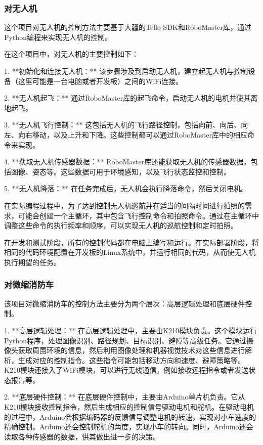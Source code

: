 \documentclass[12pt, a4paper, oneside]{article}
\begin{document}
\subsubsection{对无人机}

这个项目对无人机的控制方法主要基于大疆的Tello SDK和RoboMaster库，通过Python编程来实现无人机的控制。

在这个项目中，对无人机的主要控制如下：

1. **初始化和连接无人机：** 该步骤涉及到启动无人机，建立起无人机与控制设备（这里可能是一台电脑或者开发板）之间的WiFi连接。

2. **无人机起飞：** 通过RoboMaster库的起飞命令，启动无人机的电机并使其离地起飞。

3. **无人机飞行控制：** 这包括无人机的飞行路径控制，包括向前、向后、向左、向右移动，以及上升和下降。这些控制都可以通过RoboMaster库中的相应命令来实现。

4. **获取无人机传感器数据：** RoboMaster库还能获取无人机的传感器数据，包括图像、姿态等。这些数据可用于环境感知，以及飞行状态监控和控制。

5. **无人机降落：** 在任务完成后，无人机会执行降落命令，然后关闭电机。

在实际编程过程中，为了达到控制无人机巡航并在适当的间隔时间进行拍照的需求，可能会创建一个主循环，其中包含飞行控制命令和拍照命令。通过在主循环中调整这些命令的执行频率和顺序，可以实现无人机的巡航控制和定时拍照。

在开发和测试阶段，所有的控制代码都在电脑上编写和运行。在实际部署阶段，将相同的代码环境配置在开发板的Linux系统中，并运行相同的代码，从而使无人机执行期望的任务。

\subsubsection{对微缩消防车}

该项目对微缩消防车的控制方法主要分为两个层次：高层逻辑处理和底层硬件控制。

1. **高层逻辑处理：** 在高层逻辑处理中，主要由K210模块负责。这个模块运行Python程序，处理图像识别、路径规划、目标识别、避障等高级任务。它通过摄像头获取周围环境的信息，然后利用图像处理和机器视觉技术对这些信息进行解析，生成对应的控制指令。这些指令可能包括移动方向和速度、避障策略等。K210模块还接入了WiFi模块，可以进行无线通信，例如接收远程指令或者发送状态报告等。

2. **底层硬件控制：** 在底层硬件控制中，主要由Arduino单片机负责。它从K210模块接收控制指令，然后生成相应的控制信号驱动电机和舵机。在驱动电机的过程中，Arduino会根据编码器的反馈信号调整电机的转速，实现对小车速度的精确控制。Arduino还会控制舵机的角度，实现小车的转向。同时，Arduino还会读取各种传感器的数据，供其做出进一步的决策。
\end{document}
